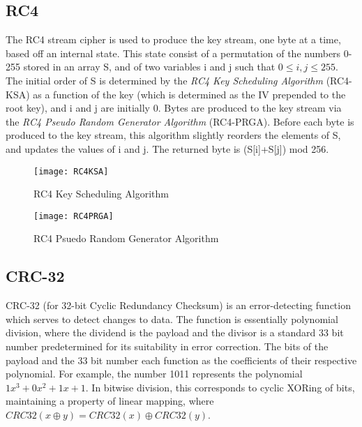 \documentclass[12pt]{article}
\begin{document}
\subsection{RC4}
The RC4 stream cipher is used to produce the key stream, one byte at a time, based off an internal state.  This state consist of a permutation of the numbers 0-255 stored in an array S, and of two variables i and j such that $0\leq i,j\leq 255$.  The initial order of S is determined by the \textit{ RC4 Key Scheduling Algorithm} (RC4-KSA) as a function of the key (which is determined as the IV prepended to the  root key), and i and j are initially 0.  Bytes are produced to the key stream via the \textit{RC4 Pseudo Random Generator Algorithm} (RC4-PRGA).  Before each byte is produced to the key stream, this algorithm slightly reorders the elements of S, and updates the values of i and j.  The returned byte is (S[i]+S[j]) mod 256.
\begin{figure}[t]
\centering
\texttt{[image: RC4KSA]}
\caption{RC4 Key Scheduling Algorithm}
\label{fig:rc4ksa}
\end{figure}
\begin{figure}[b]
\centering
\texttt{[image: RC4PRGA]}
\caption{RC4 Psuedo Random Generator Algorithm}
\label{fig:rc4prga}
\end{figure}

\subsection{CRC-32}
\label{sec:crc}
CRC-32 (for 32-bit Cyclic Redundancy Checksum) is an error-detecting function which serves to detect changes to data.  The function is essentially polynomial division, where the dividend is the payload and the divisor is a standard 33 bit number predetermined for its suitability in error correction.  The bits of the payload and the 33 bit number each function as the coefficients of their respective polynomial.  For example, the number 1011 represents the polynomial $1x^3+0x^2+1x+1$.  In bitwise division, this corresponds to cyclic XORing of bits, maintaining a property of linear mapping, where $CRC32(x\oplus y)=CRC32(x)\oplus CRC32(y)$.
\end{document}
